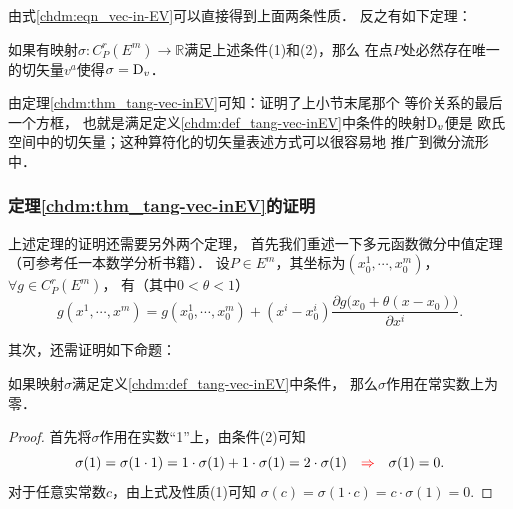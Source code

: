 由式\eqref{chdm:eqn_vec-in-EV}可以直接得到上面两条性质．
反之有如下定理：  


\begin{theorem}\label{chdm:thm_tang-vec-inEV}
    如果有映射$\sigma:C^r_P(E^m) \to \mathbb{R}$满足上述条件(1)和(2)，那么
    在点$P$处必然存在唯一的切矢量$v^a$使得$\sigma = {\rm D}_v$．
\end{theorem}
{\kaishu 由定理\ref{chdm:thm_tang-vec-inEV}可知：证明了上小节末尾那个
等价关系的最后一个方框}，
也就是满足定义\ref{chdm:def_tang-vec-inEV}中条件的映射${\rm D}_v$便是
欧氏空间中的{\heiti 切矢量}；这种算符化的切矢量表述方式可以很容易地
推广到微分流形中．

\subsubsection{定理\ref{chdm:thm_tang-vec-inEV}的证明}
上述定理的证明还需要另外两个定理，
首先我们重述一下多元函数微分中值定理（可参考任一本数学分析书籍）．
设$P\in E^m$，其坐标为$(x^1_0,\cdots,x^m_0)$，$\forall g\in C^r_P(E^m)$，
有（其中$0<\theta<1$）
\begin{equation}\label{chdm:eqn_wfzzdl}
    g(x^1,\cdots,x^m)=g(x^1_0,\cdots,x^m_0)+ 
    (x^i-x^i_0) \frac{\partial g\bigl(x_0+\theta(x-x_0) \bigr)}{\partial x^i}.        
\end{equation}

其次，还需证明如下命题：
\begin{proposition}\label{chdm:thm_dc0}
    如果映射$\sigma$满足定义\ref{chdm:def_tang-vec-inEV}中条件，
    那么$\sigma$作用在常实数上为零．    
\end{proposition}
\begin{proof}
    首先将$\sigma$作用在实数“1”上，由条件(2)可知
    \begin{equation*}
        \sigma(1)=\sigma(1\cdot 1)=1\cdot \sigma(1)+ 1\cdot \sigma(1)
        =2\cdot \sigma(1) 
        \quad {\color{red}\Rightarrow} \quad
        \sigma(1)=0.        
    \end{equation*}
    对于任意实常数$c$，由上式及性质(1)可知
    $\sigma(c)=\sigma(1\cdot c)=c\cdot \sigma(1)=0.$
\end{proof}

